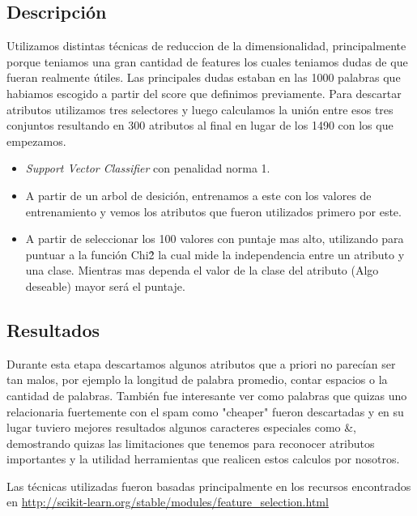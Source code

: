 \subsection{Descripción}

Utilizamos distintas técnicas de reduccion de la dimensionalidad, principalmente porque teniamos una gran cantidad de features los cuales teniamos dudas de que fueran realmente útiles. Las principales dudas estaban en las 1000 palabras que habiamos escogido a partir del score que definimos previamente. Para descartar atributos utilizamos tres selectores y luego calculamos la unión entre esos tres conjuntos resultando en 300 atributos al final en lugar de los 1490 con los que empezamos.
\begin{itemize}

\item \textit{Support Vector Classifier} con penalidad norma 1.

\item A partir de un arbol de desición, entrenamos a este con los valores de entrenamiento y vemos los atributos que fueron utilizados primero por este.

\item A partir de seleccionar los 100 valores con puntaje mas alto, utilizando para puntuar a la función Chi\^2 la cual mide la independencia entre un atributo y una clase. Mientras mas dependa el valor de la clase del atributo (Algo deseable) mayor será el puntaje.

\end{itemize}

\subsection{Resultados}

Durante esta etapa descartamos algunos atributos que a priori no parecían ser tan malos, por ejemplo la longitud de palabra promedio, contar espacios o la cantidad de palabras. También fue interesante ver como palabras que quizas uno relacionaria fuertemente con el spam como "cheaper" fueron descartadas y en su lugar tuviero mejores resultados algunos caracteres especiales como \&, demostrando quizas las limitaciones que tenemos para reconocer atributos importantes y la utilidad herramientas que realicen estos calculos por nosotros.

Las técnicas utilizadas fueron basadas principalmente en los recursos encontrados en \url{http://scikit-learn.org/stable/modules/feature_selection.html}